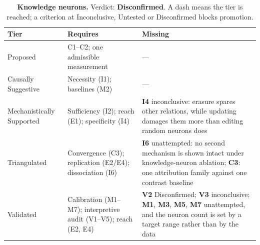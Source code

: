 \begin{table}[H]
\centering
\footnotesize
\caption{\textbf{Knowledge neurons.} Verdict: \textbf{Disconfirmed}. A dash means the tier is reached; a criterion at
Inconclusive, Untested or Disconfirmed blocks promotion.}
\label{tab:knowledge_neurons-verdict}
\renewcommand{\arraystretch}{1.18}
\begin{tabular}{@{}l>{\raggedright\arraybackslash}p{3.6cm}>{\raggedright\arraybackslash}p{4.4cm}@{}}
\toprule
\textbf{Tier} & \textbf{Requires} & \textbf{Missing} \\
\midrule
Proposed & C1--C2; one admissible measurement & --- \\
\addlinespace[2pt]
Causally Suggestive & Necessity (I1); baselines (M2) & --- \\
\addlinespace[2pt]
Mechanistically Supported & Sufficiency (I2); reach (E1); specificity (I4) & \textbf{I4} inconclusive: erasure spares other relations, while updating damages them more than editing random neurons does \\
\addlinespace[2pt]
Triangulated & Convergence (C3); replication (E2/E4); dissociation (I6) & \textbf{I6} unattempted: no second mechanism is shown intact under knowledge-neuron ablation; \textbf{C3}: one attribution family against one contrast baseline \\
\addlinespace[2pt]
Validated & Calibration (M1--M7); interpretive audit (V1--V5); reach (E2, E4) & \textbf{V2} Disconfirmed; \textbf{V3} inconclusive; \textbf{M1}, \textbf{M3}, \textbf{M5}, \textbf{M7} unattempted, and the neuron count is set by a target range rather than by the data \\
\bottomrule
\end{tabular}
\end{table}
